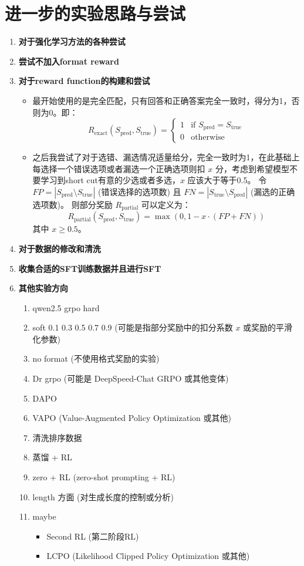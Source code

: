 \documentclass{pkuthesis}
\begin{document}
\section{进一步的实验思路与尝试}
\begin{enumerate}[label=\arabic*.]
    \item \textbf{对于强化学习方法的各种尝试}
    \item \textbf{尝试不加入format reward}
    \item \textbf{对于reward function的构建和尝试}
    \begin{itemize}
        \item 最开始使用的是完全匹配，只有回答和正确答案完全一致时，得分为1，否则为0。即：
        $$ R_{\text{exact}}(S_{\text{pred}}, S_{\text{true}}) = \begin{cases} 1 & \text{if } S_{\text{pred}} = S_{\text{true}} \\ 0 & \text{otherwise} \end{cases} $$
        \item 之后我尝试了对于选错、漏选情况适量给分，完全一致时为1，在此基础上每选择一个错误选项或者漏选一个正确选项则扣 $x$ 分，考虑到希望模型不要学习到short cut有意的少选或者多选，$x$ 应该大于等于0.5。
        令 $FP = |S_{\text{pred}} \setminus S_{\text{true}}|$ (错误选择的选项数) 且 $FN = |S_{\text{true}} \setminus S_{\text{pred}}|$ (漏选的正确选项数)。
        则部分奖励 $R_{\text{partial}}$ 可以定义为：
        $$ R_{\text{partial}}(S_{\text{pred}}, S_{\text{true}}) = \max(0, 1 - x \cdot (FP + FN)) $$
        其中 $x \ge 0.5$。
    \end{itemize}
    \item \textbf{对于数据的修改和清洗}
    \item \textbf{收集合适的SFT训练数据并且进行SFT}
    \item \textbf{其他实验方向}
    \begin{enumerate}[label=\arabic*.]
        \item qwen2.5 grpo hard
        \item soft 0.1 0.3 0.5 0.7 0.9 (可能是指部分奖励中的扣分系数 $x$ 或奖励的平滑化参数)
        \item no format (不使用格式奖励的实验)
        \item Dr grpo (可能是 DeepSpeed-Chat GRPO 或其他变体)
        \item DAPO
        \item VAPO (Value-Augmented Policy Optimization 或其他)
        \item 清洗排序数据
        \item 蒸馏 + RL
        \item zero + RL (zero-shot prompting + RL)
        \item length 方面 (对生成长度的控制或分析)
        \item maybe
        \begin{itemize}
            \item Second RL (第二阶段RL)
            \item LCPO (Likelihood Clipped Policy Optimization 或其他)
        \end{itemize}
    \end{enumerate}
\end{enumerate}

\printbibliography
\end{document}

